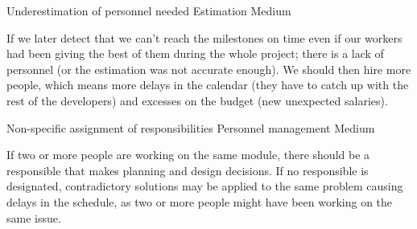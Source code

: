 \begin{risk}[riskPersonnelUnderestimation]{Underestimation of personnel needed}
\riskcat Estimation
 Medium

If we later detect that we can't reach the milestones on time even if our workers had been giving the best of them during the whole project; there is a lack of personnel (or the estimation was not accurate enough). We should then hire more people, which means more delays in the calendar (they have to catch up with the rest of the developers) and excesses on the budget (new unexpected salaries).
\end{risk}

\begin{risk}[riskResponsibilitesAssignment]{Non-specific assignment of responsibilities}
\riskcat Personnel management
 Medium

If two or more people are working on the same module, there should be a responsible that makes planning and design decisions. If no responsible is designated, contradictory solutions may be applied to the same problem causing delays in the schedule, as two or more people might have been working on the same issue.
\end{risk}
